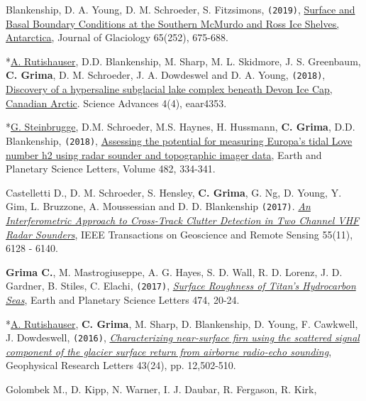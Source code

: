 \begin{etaremune}
  Blankenship, D. A. Young, D. M. Schroeder, S. Fitzsimons,
  \texttt{(2019)},
  \href{https://www.cambridge.org/core/journals/journal-of-glaciology/article/surface-and-basal-boundary-conditions-at-the-southern-mcmurdo-and-ross-ice-shelves-antarctica/3ED3BFD465A3F6A5FC48342694F91EC5}{Surface
  and Basal Boundary Conditions at the Southern McMurdo and Ross Ice
  Shelves, Antarctica}, Journal of Glaciology 65(252), 675-688.
\item
  *\underline{A. Rutishauser}, D.D. Blankenship, M. Sharp, M. L.
  Skidmore, J. S. Greenbaum, \textbf{C. Grima}, D. M. Schroeder, J. A.
  Dowdeswel and D. A. Young, \texttt{(2018)},
  \href{http://advances.sciencemag.org/content/4/4/eaar4353}{Discovery
  of a hypersaline subglacial lake complex beneath Devon Ice Cap,
  Canadian Arctic}. Science Advances 4(4), eaar4353.
\item
  *\underline{G. Steinbrugge}, D.M. Schroeder, M.S. Haynes, H. Hussmann,
  \textbf{C. Grima}, D.D. Blankenship, \texttt{(2018)},
  \href{https://www.sciencedirect.com/science/article/pii/S0012821X17306647}{Assessing
  the potential for measuring Europa's tidal Love number h2 using radar
  sounder and topographic imager data}, Earth and Planetary Science
  Letters, Volume 482, 334-341.
\item
  Castelletti D., D. M. Schroeder, S. Hensley, \textbf{C. Grima}, G. Ng,
  D. Young, Y. Gim, L. Bruzzone, A. Moussessian and D. D. Blankenship
  \texttt{(2017)}.
  \href{http://ieeexplore.ieee.org/abstract/document/8012547/}{\emph{An
  Interferometric Approach to Cross-Track Clutter Detection in Two
  Channel VHF Radar Sounders}}, IEEE Transactions on Geoscience and
  Remote Sensing 55(11), 6128 - 6140.
\item
  \textbf{Grima C.}, M. Mastrogiuseppe, A. G. Hayes, S. D. Wall, R. D.
  Lorenz, J. D. Gardner, B. Stiles, C. Elachi, \texttt{(2017)},
  \href{http://www.sciencedirect.com/science/article/pii/S0012821X17303163}{\emph{Surface
  Roughness of Titan's Hydrocarbon Seas}}, Earth and Planetary Science
  Letters 474, 20-24.
\item
  *\underline{A. Rutishauser}, \textbf{C. Grima}, M. Sharp, D.
  Blankenship, D. Young, F. Cawkwell, J. Dowdeswell, \texttt{(2016)},
  \href{http://onlinelibrary.wiley.com/doi/10.1002/2016GL071230/full}{\emph{Characterizing
  near-surface firn using the scattered signal component of the glacier
  surface return from airborne radio-echo sounding}}, Geophysical
  Research Letters 43(24), pp. 12,502-510.
\item
  Golombek M., D. Kipp, N. Warner, I. J. Daubar, R. Fergason, R. Kirk,

\end{etaremune}
